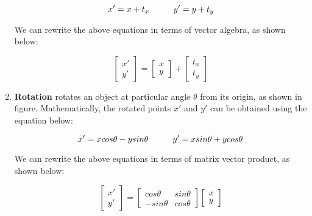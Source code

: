 \documentclass{book}
\begin{document}
\begin{enumerate}
                    \begin{equation} \label{eq_transNaive}
                        x' = x + t_{x} \hspace{10mm} y' = y + t_{y}
                    \end{equation}

                    We can rewrite the above equations in terms of vector algebra, as shown below: 

                    \begin{equation}
                        \begin{bmatrix}
                            x'\\ 
                            y'
                            \end{bmatrix} = 
                            \begin{bmatrix}
                            x\\ 
                            y
                            \end{bmatrix} + \begin{bmatrix}
                            t_{x}\\ 
                            t_{y}
                            \end{bmatrix}
                    \end{equation}
                    \item \textbf{Rotation} rotates an object at particular angle $\theta$ from its origin, as shown in figure. Mathematically, 
                    the rotated points $x'$ and $y'$ can be obtained using the equation below: 

                    \begin{equation}
                        x' = x cos\theta - ysin\theta \hspace{10mm} y' = xsin\theta + ycos\theta
                    \end{equation}

                    We can rewrite the above equations in terms of matrix vector product, as shown below: 

                    \begin{equation}
                        \begin{bmatrix}
                            x'\\ 
                            y'
                            \end{bmatrix} = \begin{bmatrix}
                            cos\theta & sin\theta\\ 
                            -sin\theta & cos\theta 
                            \end{bmatrix} 
                            \begin{bmatrix}
                            x\\ 
                            y
                            \end{bmatrix}
                    \end{equation}


\end{enumerate}
\end{document}
